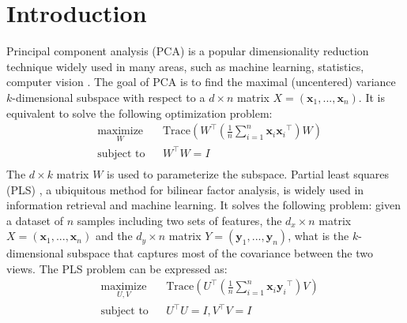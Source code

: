 \documentclass[conference]{IEEEtran}
\begin{document}
\section{Introduction}
\label{introduction}
Principal component analysis (PCA) is a popular dimensionality reduction technique widely used in many areas, such as machine learning, statistics, computer vision \citep{Stockman2001Computer}. The goal of PCA is to find the maximal (uncentered) variance $k$-dimensional subspace with respect to a $d \times n$ matrix $X = (\mathbf{x}_1, ... , \mathbf{x}_n)$. It is equivalent to solve the following optimization problem:
\begin{equation}
\label{pca-obj}
\begin{aligned}
& \underset{W}{\text{maximize}}
& & \mathrm{Trace}(W^{\top}(\frac{1}{n}\sum\limits_{i=1}^{n}\mathbf{x}_{i}{\mathbf{x}_i}^\top)W) \\
& \text{subject to}
& & W^{\top}W=I \\
\end{aligned}
\end{equation}
The  $d\times k$ matrix $W$ is used to parameterize the subspace.
Partial least squares (PLS) \citep{Chiang2001Partial}, a ubiquitous method for bilinear factor analysis, is widely used in information retrieval \citep{Salton2003Information} and machine learning. It solves the following problem: given a dataset of $n$ samples including  two sets of features, 
the $d_x \times n$ matrix $X = (\mathbf{x}_1, ... , \mathbf{x}_n)$ and the $d_y \times n$ matrix $Y = (\mathbf{y}_1, ... , \mathbf{y}_n)$, what is the $k$-dimensional subspace that captures most of the covariance between the two views. 
The PLS problem can be expressed as:
\begin{equation}
\label{pls-obj}
\begin{aligned}
& \underset{U,V}{\text{maximize}}
& & \mathrm{Trace}(U^{\top}(\frac{1}{n}\sum\limits_{i=1}^{n}\mathbf{x}_{i}{\mathbf{y}_i}^\top)V) \\
& \text{subject to}
& & U^{\top}U = I, V^{\top}V=I \\
\end{aligned}
\end{equation}
\end{document}
